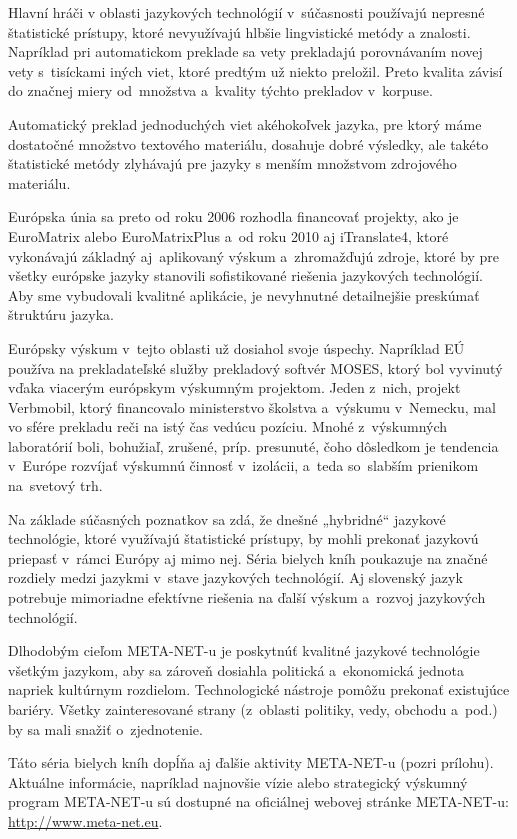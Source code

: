 \begin{multicols}{2}
Hlavní hráči v oblasti jazykových technológií v~súčasnosti
používajú nepresné štatistické prístupy, ktoré nevyužívajú
hlbšie lingvistické metódy a znalosti.
Napríklad pri automatickom preklade sa vety 
prekladajú porovnávaním novej vety s~tisíckami iných viet, ktoré
predtým už niekto preložil. Preto kvalita závisí do značnej miery
od~množstva a~kvality týchto prekladov v~korpuse.


Automatický preklad
jednoduchých viet akéhokoľvek jazyka, pre ktorý máme dostatočné
množstvo textového materiálu, dosahuje dobré výsledky, ale takéto
štatistické metódy zlyhávajú pre jazyky s menším množstvom zdrojového materiálu.

Európska únia sa preto od roku 2006 rozhodla financovať projekty, ako
je EuroMatrix alebo EuroMatrixPlus a~od roku 2010 aj iTranslate4, ktoré
vykonávajú základný aj~aplikovaný výskum a~zhromažďujú zdroje,
ktoré by pre všetky európske jazyky stanovili sofistikované
riešenia jazykových technológií. Aby sme vybudovali kvalitné
aplikácie, je nevyhnutné detailnejšie preskúmať štruktúru jazyka.

Európsky výskum v~tejto oblasti už dosiahol svoje úspechy.
Napríklad EÚ používa na prekladateľské služby prekladový
softvér MOSES, ktorý bol vyvinutý vďaka viacerým európskym
výskumným projektom. Jeden z~nich, projekt Verbmobil, ktorý
financovalo ministerstvo školstva a~výskumu v~Nemecku, mal vo sfére
prekladu reči na istý čas vedúcu pozíciu. Mnohé z~výskumných
laboratórií boli, bohužiaľ, zrušené, príp. presunuté, čoho
dôsledkom je tendencia v~Európe rozvíjať výskumnú činnosť
v~izolácii, a~teda so~slabším prienikom na~svetový trh.

Na základe súčasných poznatkov sa zdá, že dnešné „hybridné“ jazykové technológie, ktoré využívajú štatistické prístupy, by mohli prekonať jazykovú priepasť v~rámci Európy aj mimo nej. Séria bielych kníh poukazuje na značné rozdiely medzi jazykmi v~stave jazykových technológií. Aj slovenský jazyk potrebuje mimoriadne efektívne riešenia na ďalší výskum a~rozvoj jazykových technológií.


Dlhodobým cieľom META-NET-u je pos\-kyt\-núť kvalitné jazykové technológie všetkým jazykom, aby sa zároveň dosiahla politická a~ekonomická jednota napriek kultúrnym rozdielom. Technologické nástroje pomôžu prekonať existujúce bariéry. Všetky zainteresované strany (z~oblasti politiky, vedy, obchodu a~pod.) by sa mali snažiť o~zjednotenie.

Táto séria bielych kníh dopĺňa aj ďalšie aktivity META-NET-u (pozri prílohu). Aktuálne informácie, napríklad najnovšie vízie alebo strategický výskumný program META-NET-u sú dostupné na oficiálnej webovej stránke META-NET-u: \url{http://www.meta-net.eu}.
\end{multicols}

